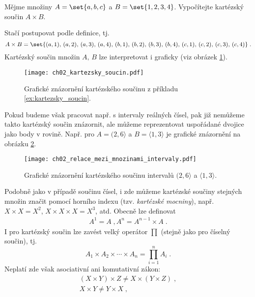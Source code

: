 \begin{example}\label{ex:kartezsky_soucin}
    Mějme množiny $A=\set{a,b,c}$ a $B=\set{1,2,3,4}$. Vypočítejte kartézský součin $A\times B$.
\end{example}
\begin{solution}
    Stačí postupovat podle definice, tj.
    \begin{equation*}
        A\times B=\set{(a,1),\,(a,2),\,(a,3),\,(a,4),\,(b,1),\,(b,2),\,(b,3),\,(b,4),\,(c,1),\,(c,2),\,(c,3),\,(c,4)}\; .
    \end{equation*}
    Kartézský součin množin $A,\,B$ lze interpretovat i graficky (viz obrázek \ref{fig:kartezsky_soucin}).
\end{solution}
\begin{figure}[h]
    \centering
    \texttt{[image: ch02\_kartezsky\_soucin.pdf]}
    \caption{Grafické znázornění kartézského součinu z příkladu \ref{ex:kartezsky_soucin}.}
    \label{fig:kartezsky_soucin}
\end{figure}
Pokud budeme však pracovat např. s intervaly reálných čísel, pak již nemůžeme takto kartézský součin znázornit, ale můžeme reprezentovat uspořádané dvojice jako body v rovině. Např. pro $A=(2, 6\rangle$ a $B=\langle 1,3 \rangle$ je grafické znázornění na obrázku \ref{fig:kartezsky_soucin_intervaly}.
\begin{figure}[h]
    \centering
    \texttt{[image: ch02\_relace\_mezi\_mnozinami\_intervaly.pdf]}
    \caption{Grafické znázornění kartézského součinu intervalů $(2, 6\rangle$ a $\langle 1,3 \rangle$.}
    \label{fig:kartezsky_soucin_intervaly}
\end{figure}
Podobně jako v případě součinu čísel, i zde můžeme kartézské součiny stejných množin značit pomocí horního indexu (tzv. \emph{kartézské mocniny}), např. $X\times X=X^2$, $X\times X\times X=X^3$, atd. Obecně lze definovat
\begin{align*}
    A^1=A\; ,
    A^n=A^{n-1}\times A\; .
\end{align*}
I pro kartézský součin lze zavést velký operátor $\prod$ (stejně jako pro číselný součin), tj.
\begin{equation*}
    A_1\times A_2 \times\cdots\times A_n=\prod\limits_{i=1}^{n}{A_i}\; .
\end{equation*}
Neplatí zde však asociativní ani komutativní zákon:
\begin{align*}
    (X\times Y)\times Z\neq X\times (Y\times Z)\; ,\\
    X\times Y\neq Y\times X\; ,
\end{align*}

